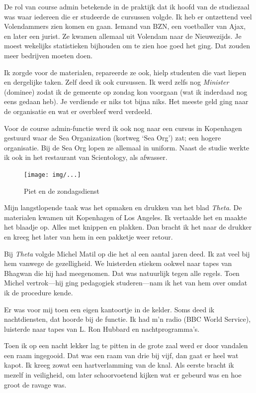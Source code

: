 \documentclass[12pt,twoside]{memoir}
\begin{document}
De rol van course admin betekende in de praktijk dat ik hoofd van de studiezaal was waar iedereen die er studeerde de cursussen volgde. Ik heb er ontzettend veel Volendammers zien komen en gaan. Iemand van BZN, een voetballer van Ajax, en later een jurist. Ze kwamen allemaal uit Volendam naar de Nieuwezijds. Je moest wekelijks statistieken bijhouden om te zien hoe goed het ging. Dat zouden meer bedrijven moeten doen.

Ik zorgde voor de materialen, repareerde ze ook, hielp studenten die vast liepen en dergelijke taken. Zelf deed ik ook cursussen. Ik werd zelfs nog \emph{Minister} (dominee) zodat ik de gemeente op zondag kon voorgaan (wat ik inderdaad nog eens gedaan heb). Je verdiende er niks tot bijna niks. Het meeste geld ging naar de organisatie en wat er overbleef werd verdeeld. 

Voor de course admin-functie werd ik ook nog naar een cursus in Kopenhagen gestuurd waar de Sea Organization (kortweg `Sea Org') zat; een hogere organisatie. Bij de Sea Org lopen ze allemaal in uniform. Naast de studie werkte ik ook in het restaurant van Scientology, als afwasser.

\begin{figure}[t]
\texttt{[image: img/...]}
\caption{Piet en de zondagsdienst}
\end{figure}

Mijn langstlopende taak was het opmaken en drukken van het blad \emph{Theta}. De materialen kwamen uit Kopenhagen of Los Angeles. Ik vertaalde het en maakte het blaadje op. Alles met knippen en plakken. Dan bracht ik het naar de drukker en kreeg het later van hem in een pakketje weer retour. 

Bij \emph{Theta} volgde Michel Matil op die het al een aantal jaren deed. Ik zat veel bij hem vanwege de gezelligheid. We luisterden stiekem ookwel naar tapes van Bhagwan die hij had meegenomen. Dat was natuurlijk tegen alle regels. Toen Michel vertrok---hij ging pedagogiek studeren---nam ik het van hem over omdat ik de procedure kende. 

Er was voor mij toen een eigen kantoortje in de kelder. Soms deed ik nachtdiensten, dat hoorde bij de functie. Ik had m’n radio (BBC World Service), luisterde naar tapes van L. Ron Hubbard en nachtprogramma’s. 

Toen ik op een nacht lekker lag te pitten in de grote zaal werd er door vandalen een raam ingegooid. Dat was een raam van drie bij vijf, dan gaat er heel wat kapot. Ik kreeg zowat een hartverlamming van de knal. Als eerste bracht ik mezelf in veiligheid, om later schoorvoetend kijken wat er gebeurd was en hoe groot de ravage was.
\end{document}
